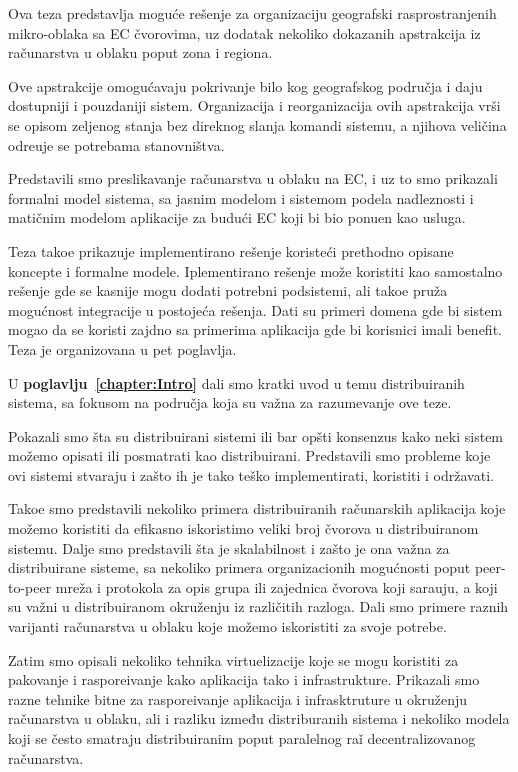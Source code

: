 \noindent
Ova teza predstavlja mogu\'ce re\v senje za organizaciju geografski rasprostranjenih mikro-oblaka sa EC čvorovima, uz dodatak nekoliko dokazanih apstrakcija iz ra\v cunarstva u oblaku poput zona i regiona.

Ove apstrakcije omogu\'cavaju pokrivanje bilo kog geografskog područja i daju dostupniji i pouzdaniji sistem. Organizacija i reorganizacija ovih apstrakcija vr\v si se opisom zeljenog stanja bez direknog slanja komandi sistemu, a njihova veli\v cina odre\dj uje se potrebama stanovni\v stva.

Predstavili smo preslikavanje ra\v cunarstva u oblaku na EC, i uz to smo prikazali formalni model sistema, sa jasnim modelom i sistemom podela nadleznosti i mati\v cnim modelom aplikacije za budu\'ci EC koji bi bio ponu\dj en kao usluga. 

Teza tako\dj e prikazuje implementirano re\v senje koriste\'ci prethodno opisane koncepte i formalne modele. Iplementirano re\v senje mo\v ze koristiti kao samostalno re\v senje gde se kasnije mogu dodati potrebni podsistemi, ali tako\dj e pru\v za mogu\'cnost integracije u postoje\'ca re\v senja. Dati su primeri domena gde bi sistem mogao da se koristi zajdno sa primerima aplikacija gde bi korisnici imali benefit. Teza je organizovana u pet poglavlja.

U \textbf{poglavlju~\ref{chapter:Intro}} dali smo kratki uvod u temu distribuiranih sistema, sa fokusom na podru\v cja koja su va\v zna za razumevanje ove teze.

Pokazali smo \v sta su distribuirani sistemi ili bar op\v sti konsenzus kako neki sistem mo\v zemo opisati ili posmatrati kao distribuirani. Predstavili smo probleme koje ovi sistemi stvaraju i za\v sto ih je tako te\v sko implementirati, koristiti i odr\v zavati.

Tako\dj e smo predstavili nekoliko primera distribuiranih ra\v cunarskih aplikacija koje možemo koristiti da efikasno iskoristimo veliki broj \v cvorova u distribuiranom sistemu. Dalje smo predstavili \v sta je skalabilnost i za\v sto je ona va\v zna za distribuirane sisteme, sa nekoliko primera organizacionih mogu\'cnosti poput peer-to-peer mre\v za i protokola za opis grupa ili zajednica \v cvorova koji sara\dj uju, a koji su va\v zni u distribuiranom okru\v zenju iz razli\v citih razloga. Dali smo primere raznih varijanti ra\v cunarstva u oblaku koje mo\v zemo iskoristiti za svoje potrebe.

Zatim smo opisali nekoliko tehnika virtuelizacije koje se mogu koristiti za pakovanje i raspore\dj ivanje kako aplikacija tako i infrastrukture. Prikazali smo razne tehnike bitne za raspore\dj ivanje aplikacija i infrasktruture u okru\v zenju ra\v cunarstva u oblaku, ali i razliku između distriburanih sistema i nekoliko modela koji se \v cesto smatraju distribuiranim poput paralelnog ra\v i decentralizovanog ra\v cunarstva.

